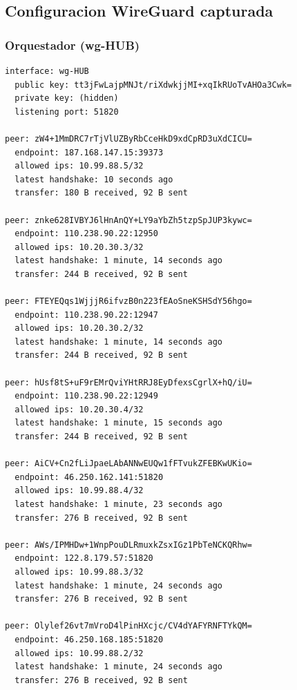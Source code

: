 \documentclass[11pt,a4paper]{article}
\begin{document}
\subsection{Configuracion WireGuard capturada}
\subsubsection*{Orquestador (wg-HUB)}
\begin{lstlisting}
interface: wg-HUB
  public key: tt3jFwLajpMNJt/riXdwkjjMI+xqIkRUoTvAHOa3Cwk=
  private key: (hidden)
  listening port: 51820

peer: zW4+1MmDRC7rTjVlUZByRbCceHkD9xdCpRD3uXdCICU=
  endpoint: 187.168.147.15:39373
  allowed ips: 10.99.88.5/32
  latest handshake: 10 seconds ago
  transfer: 180 B received, 92 B sent

peer: znke628IVBYJ6lHnAnQY+LY9aYbZh5tzpSpJUP3kywc=
  endpoint: 110.238.90.22:12950
  allowed ips: 10.20.30.3/32
  latest handshake: 1 minute, 14 seconds ago
  transfer: 244 B received, 92 B sent

peer: FTEYEQqs1WjjjR6ifvzB0n223fEAoSneKSHSdY56hgo=
  endpoint: 110.238.90.22:12947
  allowed ips: 10.20.30.2/32
  latest handshake: 1 minute, 14 seconds ago
  transfer: 244 B received, 92 B sent

peer: hUsf8tS+uF9rEMrQviYHtRRJ8EyDfexsCgrlX+hQ/iU=
  endpoint: 110.238.90.22:12949
  allowed ips: 10.20.30.4/32
  latest handshake: 1 minute, 15 seconds ago
  transfer: 244 B received, 92 B sent

peer: AiCV+Cn2fLiJpaeLAbANNwEUQw1fFTvukZFEBKwUKio=
  endpoint: 46.250.162.141:51820
  allowed ips: 10.99.88.4/32
  latest handshake: 1 minute, 23 seconds ago
  transfer: 276 B received, 92 B sent

peer: AWs/IPMHDw+1WnpPouDLRmuxkZsxIGz1PbTeNCKQRhw=
  endpoint: 122.8.179.57:51820
  allowed ips: 10.99.88.3/32
  latest handshake: 1 minute, 24 seconds ago
  transfer: 276 B received, 92 B sent

peer: Olylef26vt7mVroD4lPinHXcjc/CV4dYAFYRNFTYkQM=
  endpoint: 46.250.168.185:51820
  allowed ips: 10.99.88.2/32
  latest handshake: 1 minute, 24 seconds ago
  transfer: 276 B received, 92 B sent

\end{lstlisting}
\end{document}
